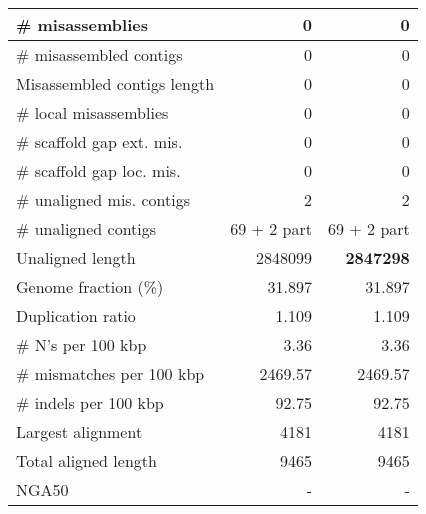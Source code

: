 \documentclass[12pt,a4paper]{article}
\begin{document}
\begin{table}[ht]
\begin{center}
\begin{tabular}{|l*{2}{|r}|}
\# misassemblies & 0 & 0 \\ \hline
\# misassembled contigs & 0 & 0 \\ \hline
Misassembled contigs length & 0 & 0 \\ \hline
\# local misassemblies & 0 & 0 \\ \hline
\# scaffold gap ext. mis. & 0 & 0 \\ \hline
\# scaffold gap loc. mis. & 0 & 0 \\ \hline
\# unaligned mis. contigs & 2 & 2 \\ \hline
\# unaligned contigs & 69 + 2 part & 69 + 2 part \\ \hline
Unaligned length & 2848099 & {\bf 2847298} \\ \hline
Genome fraction (\%) & 31.897 & 31.897 \\ \hline
Duplication ratio & 1.109 & 1.109 \\ \hline
\# N's per 100 kbp & 3.36 & 3.36 \\ \hline
\# mismatches per 100 kbp & 2469.57 & 2469.57 \\ \hline
\# indels per 100 kbp & 92.75 & 92.75 \\ \hline
Largest alignment & 4181 & 4181 \\ \hline
Total aligned length & 9465 & 9465 \\ \hline
NGA50 & - & - \\ \hline
\end{tabular}
\end{center}
\end{table}
\end{document}
